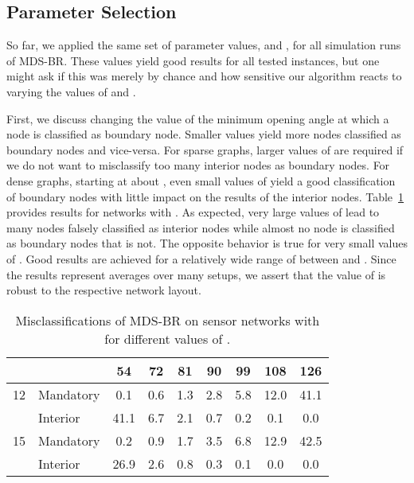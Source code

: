 \documentclass{llncs}
\begin{document}
\subsection{Parameter Selection}\label{ssec:parameter_tuning}
So far, we applied the same set of parameter values,  and , for all simulation runs of MDS-BR.
These values yield good results for all tested instances, but one might ask if this was merely by chance and how sensitive our algorithm reacts to varying the values of  and .

First, we discuss changing the value of the minimum opening angle  at which a node is classified as boundary node.
Smaller values yield more nodes classified as boundary nodes and vice-versa.
For sparse graphs, larger values of  are required if we do not want to misclassify too many interior nodes as boundary nodes.
For dense graphs, starting at about , even small values of  yield a good classification of boundary nodes with little impact on the results of the interior nodes.
Table~\ref{tab:mdsbr_angle} provides results for networks with .
As expected, very large values of  lead to many nodes falsely classified as interior nodes while almost no node is classified as boundary nodes that is not.
The opposite behavior is true for very small values of .
Good results are achieved for a relatively wide range of  between  and .
Since the results represent averages over many setups, we assert that the value of  is robust to the respective network layout.

\begin{table}[b]
\setlength\tabcolsep{5pt}
\centering
\caption{Misclassifications of MDS-BR on sensor networks with  for different values of .}\label{tab:mdsbr_angle}
\begin{tabular}{cl||ccccccc}
&  & 54 & 72 & 81 & 90 & 99 & 108 & 126 \\
\hline
12 & Mandatory &  0.1 & 0.6 & 1.3 & 2.8 & 5.8 & 12.0 & 41.1 \\
   & Interior  & 41.1 & 6.7 & 2.1 & 0.7 & 0.2 &  0.1 &  0.0 \\
15 & Mandatory &  0.2 & 0.9 & 1.7 & 3.5 & 6.8 & 12.9 & 42.5 \\
   & Interior  & 26.9 & 2.6 & 0.8 & 0.3 & 0.1 &  0.0 &  0.0   
\end{tabular}
\end{table}
\end{document}

